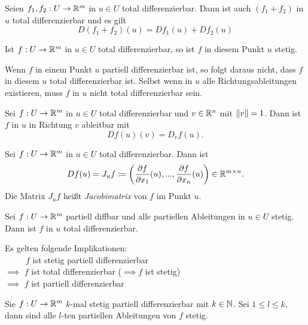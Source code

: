 \documentclass{cheat-sheet}
\begin{document}
\begin{bem}
  Seien $f_1, f_2 : U \to \mathbb{R}^m$ in $u \in U$ total differenzierbar. Dann ist auch $(f_1 + f_2)$ in $u$ total differenzierbar und es gilt
  \[ D (f_1 + f_2)(u) = D f_1(u) + D f_2(u) \]
\end{bem}

\begin{satz}
  Ist $f : U \to \mathbb{R}^m$ in $u \in U$ total differenzierbar, so ist $f$ in diesem Punkt $u$ stetig.
\end{satz}

\begin{acht}
  Wenn $f$ in einem Punkt $u$ partiell differenzierbar ist, so folgt daraus nicht, dass $f$ in diesem $u$ total differenzierbar ist. Selbst wenn in $u$ alle Richtungsableitungen existieren, muss $f$ in $u$ nicht total differenzierbar sein.
\end{acht}

\begin{satz}
  Sei $f : U \to \mathbb{R}^m$ in $u \in U$ total differenzierbar und $v \in \mathbb{R}^n$ mit $\lVert v\rVert = 1$. Dann ist $f$ in $u$ in Richtung $v$ ableitbar mit
  \[ D f(u) (v) = D_v f(u). \]
\end{satz}

\begin{defn}
  Sei $f : U \to \mathbb{R}^m$ in $u \in U$ total differenzierbar. Dann ist
  \[ D f(u) = J_u f \coloneqq \left( \frac{\partial f}{\partial x_1}(u), ..., \frac{\partial f}{\partial x_n}(u) \right) \in \mathbb{R}^{m \times n}. \]
  Die Matrix $J_u f$ heißt \emph{Jacobimatrix} von $f$ im Punkt $u$.
\end{defn}


\begin{satz}
  Sei $f : U \to \mathbb{R}^m$ partiell diffbar und alle partiellen Ableitungen in $u \in U$ stetig. Dann ist $f$ in $u$ total differenzierbar.
\end{satz}

\begin{bem}
  Es gelten folgende Implikationen:\\
  $\quad\quad\,\,\, f$ ist stetig partiell differenzierbar\\
  $\implies$ $f$ ist total differenzierbar ($\!\implies f$ ist stetig)\\
  $\implies$ $f$ ist partiell differenzierbar
\end{bem}

\begin{satz}
  Sie $f : U \to \mathbb{R}^m$ $k$-mal stetig partiell differenzierbar mit $k \in \mathbb{N}$. Sei $1 \le l \le k$, dann sind alle $l$-ten partiellen Ableitungen von $f$ stetig.
\end{satz}
\end{document}
